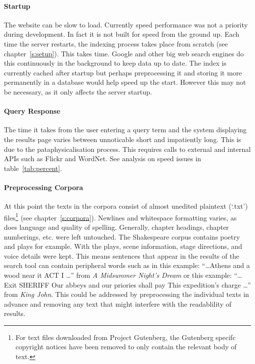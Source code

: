 \paragraph{Startup} 
The website can be slow to load. Currently speed performance was not a priority during development. In fact it is not built for speed from the ground up. Each time the server restarts, the indexing process takes place from scratch (see chapter~\ref{s:setup}). This takes time. Google and other big web search engines do this continuously in the background to keep data up to date. The index is currently cached after startup but perhaps preprocessing it and storing it more permanently in a database would help speed up the start. However this may not be necessary, as it only affects the server startup.

\paragraph{Query Response} 
The time it takes from the user entering a query term and the system displaying the results page varies between unnoticable short and impatiently long. This is due to the pataphysicalisation process. This requires calls to external and internal \ac{API}s such as Flickr and WordNet. See analysis on speed issues in table~\ref{tab:percent}.

\paragraph{Preprocessing Corpora} 
At this point the texts in the corpora consist of almost unedited plaintext (`.txt') files\footnote{For text files downloaded from Project Gutenberg, the Gutenberg specifc copyright notices have been removed to only contain the relevant body of text.} (see chapter~\ref{s:corpora}). Newlines and whitespace formatting varies, as does language and quality of spelling. Generally, chapter headings, chapter numberings, etc. were left untouched. The Shakespeare corpus contains poetry and plays for example. With the plays, scene information, stage directions, and voice details were kept. This means sentences that appear in the results of the search tool can contain peripheral words such as in this example: ``\ldots Athens and a wood near it ACT I \ldots'' from \textit{A Midsummer Night's Dream} or this example: ``\ldots Exit SHERIFF Our abbeys and our priories shall pay This expedition's charge \ldots'' from \textit{King John}. This could be addressed by preprocessing the individual texts in advance and removing any text that might interfere with the readablility of results.

